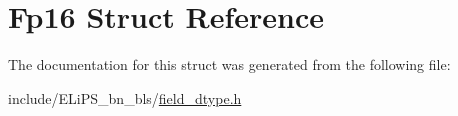 \hypertarget{struct_fp16}{}\section{Fp16 Struct Reference}
\label{struct_fp16}


The documentation for this struct was generated from the following file\+:\begin{DoxyCompactItemize}
\item 
include/\+E\+Li\+P\+S\+\_\+bn\+\_\+bls/\hyperlink{field__dtype_8h}{field\+\_\+dtype.\+h}\end{DoxyCompactItemize}
